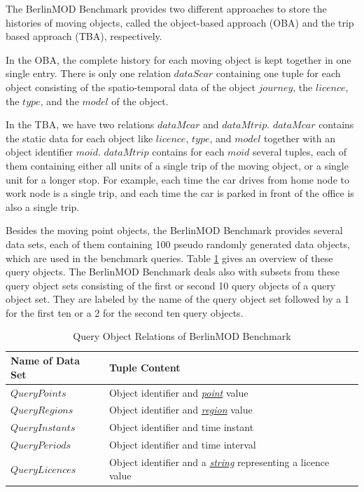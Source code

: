 \documentclass[a4paper]{article}
\newcommand{\bmodb} {BerlinMOD Benchmark}
\newcommand{\dt}[1]{\textsl{\underline{#1}}}
\begin{document}
The \bmodb{} provides two different approaches to store the histories of moving
objects, called the object-based approach (OBA) and the trip based approach (TBA),
respectively.

In the OBA, the complete history for each moving object is kept together in one
single entry. There is only one relation $dataScar$
containing one tuple for each object consisting of the spatio-temporal data of
the object $journey$, the $licence$, the $type$, and the $model$ of the object.

In the TBA, we have two relations $dataMcar$ and $dataMtrip$. $dataMcar$ contains
the static data for each object like $licence$, $type$, and $model$ together with
an object identifier $moid$. $dataMtrip$ contains for each $moid$ several tuples,
each of them containing either all units of a single trip of the moving object, or a
single unit for a longer stop. For example, each time the car drives from home node
to work node is a single trip, and each time the car is parked in front of the 
office is also a single trip.

Besides the moving point objects, the \bmodb{} provides several data sets, each 
of them containing 100 pseudo randomly generated data objects, which are used in
the benchmark queries. Table \ref{tab:queryobjects} gives an overview of these
query objects. The \bmodb{} deals also with subsets from these query object
sets consisting of the first or second 10 query objects of a query object set.
They are labeled by the name of the query object set followed by a 1 for the
first ten or a 2 for the second ten query objects.

\begin{table}[H]
  \begin{tabularx}{1.0\textwidth}{|l|X|}
    \hline
    \textbf{Name of Data Set}&\textbf{Tuple Content}\\
    \hline
    $QueryPoints$&Object identifier and \dt{point} value\\
    \hline
    $QueryRegions$&Object identifier and \dt{region} value\\
    \hline
    $QueryInstants$&Object identifier and time instant\\
    \hline
    $QueryPeriods$&Object identifier and time interval\\
    \hline
    $QueryLicences$& Object identifier and a \dt{string} representing a licence value\\
    \hline
  \end{tabularx}
  \caption{Query Object Relations of \bmodb{}}
  \label{tab:queryobjects}
\end{table}
\end{document}
